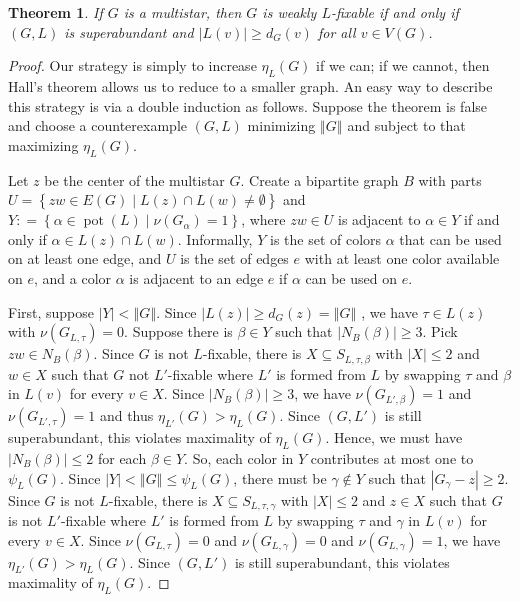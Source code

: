 \documentclass[12pt]{article}
\theoremstyle{plain}
\newtheorem{thm}{Theorem}[section]
\theoremstyle{definition}
\theoremstyle{remark}
\newcommand{\setb}[3]{\left\{ #1 \in #2 \mid #3 \right\}}
\newcommand{\card}[1]{\left|#1\right|}
\newcommand{\size}[1]{\left\Vert#1\right\Vert}
\newcommand{\DefinedAs}{\mathrel{\mathop:}=}
\newcommand{\pot}{\operatorname{pot}}
\begin{document}
\begin{thm}\label{FixabilityOfStars}
If $G$ is a multistar, then $G$ is weakly $L$-fixable if and only if $(G, L)$ is superabundant and $|L(v)| \ge d_G(v)$ for all $v \in V(G)$.
\end{thm}
\begin{proof}
	Our strategy is simply to increase $\eta_L(G)$ if we can; if we cannot, then Hall's theorem allows us to reduce to a smaller graph.  An easy way to describe this strategy is via a double induction as follows. Suppose the theorem is false and choose a counterexample $(G, L)$ minimizing $\size{G}$ and subject to that maximizing $\eta_L(G)$.  
	
	Let $z$ be the center of the multistar $G$. Create a bipartite graph $B$ with parts $U = \setb{zw}{E(G)}{L(z) \cap L(w) \ne \emptyset}$ and $Y \DefinedAs \setb{\alpha}{\pot(L)}{\nu(G_\alpha) = 1}$, where $zw \in U$ is adjacent to
	$\alpha \in Y$ if and only if $\alpha \in L(z) \cap L(w)$. Informally, $Y$ is
	the set of colors $\alpha$ that can be used on at least one edge, and $U$ is
	the set of edges $e$ with at least one color available on $e$, and a
	color $\alpha$ is adjacent to an edge $e$ if $\alpha$ can be used on $e$.
	
	First, suppose $|Y| < \size{G}$.  Since $|L(z)| \ge d_G(z) = \size{G}$ , we have $\tau \in L(z)$ with $\nu(G_{L, \tau}) = 0$.  Suppose there is $\beta \in Y$ such that $\card{N_B(\beta)} \ge 3$.  Pick $zw \in N_B(\beta)$.  
	Since $G$ is not $L$-fixable, there is $X \subseteq S_{L, \tau, \beta}$ with $|X| \le 2$ and $w \in X$ such that $G$ not $L'$-fixable where $L'$ is formed from $L$ by swapping $\tau$ and $\beta$ in $L(v)$ for every $v \in X$.  Since $\card{N_B(\beta)} \ge 3$, we have $\nu(G_{L', \beta}) = 1$ and $\nu(G_{L', \tau}) = 1$ and thus $\eta_{L'}(G) > \eta_L(G)$.  Since $(G,L')$ is still superabundant, this violates maximality of $\eta_L(G)$.  Hence, we must have $\card{N_B(\beta)} \le 2$ for each $\beta \in Y$.  So, each color in $Y$ contributes at most one to $\psi_L(G)$.  Since $|Y| < \size{G} \le \psi_L(G)$, there must be $\gamma \not \in Y$ such that $|G_\gamma - z| \ge 2$.  Since $G$ is not $L$-fixable, there is $X \subseteq S_{L, \tau, \gamma}$ with $|X| \le 2$ and $z \in X$ such that $G$ is not $L'$-fixable where $L'$ is formed from $L$ by swapping $\tau$ and $\gamma$ in $L(v)$ for every $v \in X$.  Since $\nu(G_{L, \tau}) = 0$ and $\nu(G_{L, \gamma}) = 0$ and $\nu(G_{L, \gamma}) = 1$, we have $\eta_{L'}(G) > \eta_L(G)$. Since $(G,L')$ is still superabundant, this violates maximality of $\eta_L(G)$.
	

\end{proof}
\end{document}
